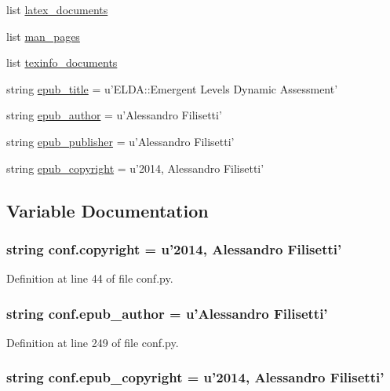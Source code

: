 \begin{DoxyCompactItemize}
\item 
list \hyperlink{a00132_a7812f49970f3de0d15dd7b9b9a10e3a1}{latex\-\_\-documents}
\item 
list \hyperlink{a00132_a85efc5fee48a26fa2d651f6eeb38fc2b}{man\-\_\-pages}
\item 
list \hyperlink{a00132_a54b0faed214ac92017d5689efbb10672}{texinfo\-\_\-documents}
\item 
string \hyperlink{a00132_a9e0d62d22b83ce34deb3f16ba63cedfe}{epub\-\_\-title} = u'E\-L\-D\-A\-::\-Emergent Levels Dynamic Assessment'
\item 
string \hyperlink{a00132_a986ebf7aa037c6bf39add300ab98a611}{epub\-\_\-author} = u'Alessandro Filisetti'
\item 
string \hyperlink{a00132_a13c40319d84c9383e0d119773cc1ed02}{epub\-\_\-publisher} = u'Alessandro Filisetti'
\item 
string \hyperlink{a00132_a443008520a058a726d07c6b5ccf45366}{epub\-\_\-copyright} = u'2014, Alessandro Filisetti'
\end{DoxyCompactItemize}


\subsection{Variable Documentation}
\hypertarget{a00132_a33fa97cf51dcb25970fbf53f10159589}{
\subsubsection[{copyright}]{\setlength{\rightskip}{0pt plus 5cm}string conf.\-copyright = u'2014, Alessandro Filisetti'}}\label{a00132_a33fa97cf51dcb25970fbf53f10159589}


Definition at line 44 of file conf.\-py.

\hypertarget{a00132_a986ebf7aa037c6bf39add300ab98a611}{
\subsubsection[{epub\-\_\-author}]{\setlength{\rightskip}{0pt plus 5cm}string conf.\-epub\-\_\-author = u'Alessandro Filisetti'}}\label{a00132_a986ebf7aa037c6bf39add300ab98a611}


Definition at line 249 of file conf.\-py.

\hypertarget{a00132_a443008520a058a726d07c6b5ccf45366}{
\subsubsection[{epub\-\_\-copyright}]{\setlength{\rightskip}{0pt plus 5cm}string conf.\-epub\-\_\-copyright = u'2014, Alessandro Filisetti'}}\label{a00132_a443008520a058a726d07c6b5ccf45366}


